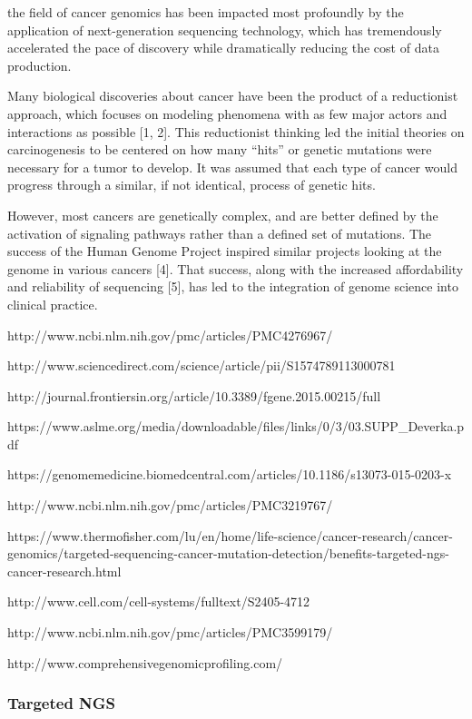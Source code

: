 {{{    the field of cancer genomics has been impacted most profoundly by the
    application of next-generation sequencing technology, which has
    tremendously accelerated the pace of discovery while dramatically reducing
    the cost of data production.

    Many biological discoveries about cancer have been the product of a reductionist
    approach, which focuses on modeling phenomena with as few major actors and
    interactions as possible [1, 2]. This reductionist thinking led the initial
    theories on carcinogenesis to be centered on how many “hits” or genetic
    mutations were necessary for a tumor to develop. It was assumed that each type
    of cancer would progress through a similar, if not identical, process of genetic
    hits.

    However, most cancers are genetically complex, and are better defined by the
    activation of signaling pathways rather than a defined set of mutations. The
    success of the Human Genome Project inspired similar projects looking at the
    genome in various cancers [4]. That success, along with the increased
    affordability and reliability of sequencing [5], has led to the integration of
    genome science into clinical practice.

    http://www.ncbi.nlm.nih.gov/pmc/articles/PMC4276967/

    http://www.sciencedirect.com/science/article/pii/S1574789113000781

    http://journal.frontiersin.org/article/10.3389/fgene.2015.00215/full

    https://www.aslme.org/media/downloadable/files/links/0/3/03.SUPP_Deverka.pdf

    https://genomemedicine.biomedcentral.com/articles/10.1186/s13073-015-0203-x

    http://www.ncbi.nlm.nih.gov/pmc/articles/PMC3219767/

    https://www.thermofisher.com/lu/en/home/life-science/cancer-research/cancer-genomics/targeted-sequencing-cancer-mutation-detection/benefits-targeted-ngs-cancer-research.html

    http://www.cell.com/cell-systems/fulltext/S2405-4712%

    http://www.ncbi.nlm.nih.gov/pmc/articles/PMC3599179/

    http://www.comprehensivegenomicprofiling.com/

    \subsubsection{Targeted NGS}

}}}
